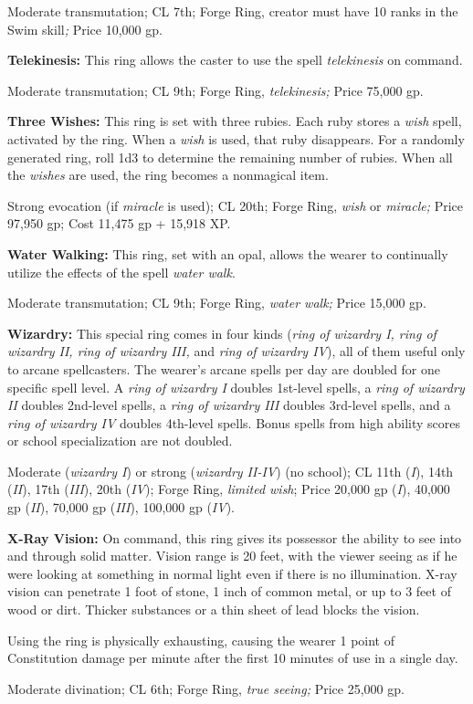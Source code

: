 Moderate transmutation; CL 7th; Forge Ring, creator must have 10 ranks in the Swim 
skill\textit{; }Price 10,000 gp.

\textbf{Telekinesis: }This ring allows the caster to use the spell \textit{telekinesis 
}on command.

Moderate transmutation; CL 9th; Forge Ring, \textit{telekinesis; }Price 75,000 
gp.

\textbf{Three Wishes:} This ring is set with three rubies. Each ruby stores a \textit{wish 
}spell, activated by the ring. When a \textit{wish }is used, that ruby disappears. 
For a randomly generated ring, roll 1d3 to determine the remaining number of rubies. 
When all the \textit{wishes }are used, the ring becomes a nonmagical item.

Strong evocation (if \textit{miracle }is used); CL 20th; Forge Ring, \textit{wish 
}or \textit{miracle; }Price 97,950 gp; Cost 11,475 gp + 15,918 XP.

\textbf{Water Walking: }This ring, set with an opal, allows the wearer to continually 
utilize the effects of the spell \textit{water walk}.

Moderate transmutation; CL 9th; Forge Ring, \textit{water walk; }Price 15,000 gp.

\textbf{Wizardry:} This special ring comes in four kinds (\textit{ring of wizardry 
I, ring of wizardry II, ring of wizardry III, }and \textit{ring of wizardry IV}), 
all of them useful only to arcane spellcasters. The wearer's arcane spells per 
day are doubled for one specific spell level. A \textit{ring of wizardry I }doubles 
1st-level spells, a \textit{ring of wizardry II }doubles 2nd-level spells, a \textit{ring 
of wizardry III }doubles 3rd-level spells, and a \textit{ring of wizardry IV }doubles 
4th-level spells. Bonus spells from high ability scores or school specialization 
are not doubled.

Moderate (\textit{wizardry I}) or strong (\textit{wizardry II-IV}) (no school); 
CL 11th (\textit{I}), 14th (\textit{II}), 17th (\textit{III}), 20th (\textit{IV}); 
Forge Ring, \textit{limited wish}; Price 20,000 gp (\textit{I}), 40,000 gp (\textit{II}), 
70,000 gp (\textit{III}), 100,000 gp (\textit{IV}).

\textbf{X-Ray Vision:} On command, this ring gives its possessor the ability to 
see into and through solid matter. Vision range is 20 feet, with the viewer seeing 
as if he were looking at something in normal light even if there is no illumination. 
X-ray vision can penetrate 1 foot of stone, 1 inch of common metal, or up to 3 
feet of wood or dirt. Thicker substances or a thin sheet of lead blocks the vision.

Using the ring is physically exhausting, causing the wearer 1 point of Constitution 
damage per minute after the first 10 minutes of use in a single day.

Moderate divination; CL 6th; Forge Ring, \textit{true seeing; }Price 25,000 gp.
